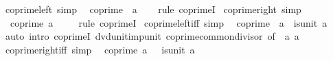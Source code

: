 \begin{isabellebody}
{\isafoldproof}%
%
\isadelimproof
\isanewline
%
\endisadelimproof
\isanewline
{}\isamarkupfalse%
\ coprime{\isacharunderscore}{\kern0pt}{}{\isacharunderscore}{\kern0pt}left\ {\isacharbrackleft}{\kern0pt}simp{\isacharbrackright}{\kern0pt}{\isacharcolon}{\kern0pt}\isanewline
\ \ {\isachardoublequoteopen}coprime\ {}\ a{\isachardoublequoteclose}\isanewline
%
\isadelimproof
\ \ %
\endisadelimproof
%
\isatagproof
{}\isamarkupfalse%
\ {\isacharparenleft}{\kern0pt}rule\ coprimeI{\isacharparenright}{\kern0pt}%
\endisatagproof
{\isafoldproof}%
%
\isadelimproof
\isanewline
%
\endisadelimproof
\isanewline
{}\isamarkupfalse%
\ coprime{\isacharunderscore}{\kern0pt}{}{\isacharunderscore}{\kern0pt}right\ {\isacharbrackleft}{\kern0pt}simp{\isacharbrackright}{\kern0pt}{\isacharcolon}{\kern0pt}\isanewline
\ \ {\isachardoublequoteopen}coprime\ a\ {}{\isachardoublequoteclose}\isanewline
%
\isadelimproof
\ \ %
\endisadelimproof
%
\isatagproof
{}\isamarkupfalse%
\ {\isacharparenleft}{\kern0pt}rule\ coprimeI{\isacharparenright}{\kern0pt}%
\endisatagproof
{\isafoldproof}%
%
\isadelimproof
\isanewline
%
\endisadelimproof
\isanewline
{}\isamarkupfalse%
\ coprime{\isacharunderscore}{\kern0pt}{}{\isacharunderscore}{\kern0pt}left{\isacharunderscore}{\kern0pt}iff\ {\isacharbrackleft}{\kern0pt}simp{\isacharbrackright}{\kern0pt}{\isacharcolon}{\kern0pt}\isanewline
\ \ {\isachardoublequoteopen}coprime\ {}\ a\ {\isasymlongleftrightarrow}\ is{\isacharunderscore}{\kern0pt}unit\ a{\isachardoublequoteclose}\isanewline
%
\isadelimproof
\ \ %
\endisadelimproof
%
\isatagproof
{}\isamarkupfalse%
\ {\isacharparenleft}{\kern0pt}auto\ intro{\isacharcolon}{\kern0pt}\ coprimeI\ dvd{\isacharunderscore}{\kern0pt}unit{\isacharunderscore}{\kern0pt}imp{\isacharunderscore}{\kern0pt}unit\ coprime{\isacharunderscore}{\kern0pt}common{\isacharunderscore}{\kern0pt}divisor\ {\isacharbrackleft}{\kern0pt}of\ {}\ a\ a{\isacharbrackright}{\kern0pt}{\isacharparenright}{\kern0pt}%
\endisatagproof
{\isafoldproof}%
%
\isadelimproof
\isanewline
%
\endisadelimproof
\isanewline
{}\isamarkupfalse%
\ coprime{\isacharunderscore}{\kern0pt}{}{\isacharunderscore}{\kern0pt}right{\isacharunderscore}{\kern0pt}iff\ {\isacharbrackleft}{\kern0pt}simp{\isacharbrackright}{\kern0pt}{\isacharcolon}{\kern0pt}\isanewline
\ \ {\isachardoublequoteopen}coprime\ a\ {}\ {\isasymlongleftrightarrow}\ is{\isacharunderscore}{\kern0pt}unit\ a{\isachardoublequoteclose}\isanewline

\end{isabellebody}
